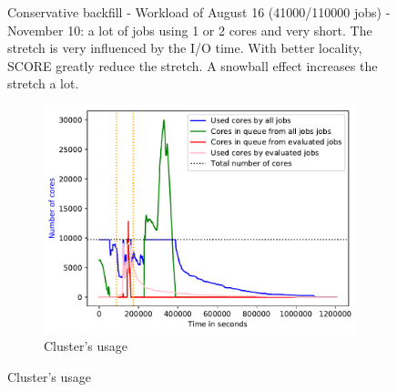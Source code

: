 \documentclass[a4paper]{article}
\begin{document}
\begin{figure}[H]
\caption{Conservative backfill - Workload of August 16 (41000/110000 jobs) - November 10: a lot of jobs using 1 or 2 cores and very short. The stretch is very influenced by the I/O time. With better locality, SCORE greatly reduce the stretch. A snowball effect increases the stretch a lot.}\end{figure}

\begin{figure}[H]\centering
\begin{subfigure}[b]{0.4\linewidth}\centering\includegraphics[width=1\linewidth]{MBSS/plot/2022-01-17->2022-01-17_V9271_Fcfs_Used_nodes_450_128_32_256_4_1024.pdf}\caption{Cluster's usage}\end{subfigure}

\end{figure}
\end{document}
